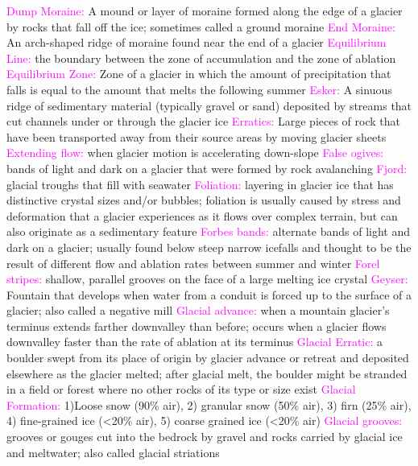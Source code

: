 \documentclass{article}
\newcommand{\pink}[1]{\textcolor{magenta}{#1}}
\newcommand{\vocab}[1]{{\pink{#1}}}
\begin{document}
\begin{multicols*}{4}
		\vocab{        Dump Moraine: } A mound or layer of moraine formed along the edge of a glacier by rocks that fall off the ice; sometimes called a ground moraine 
		\vocab{        End Moraine: } An arch-shaped ridge of moraine found near the end of a glacier 
		\vocab{Equilibrium Line: }the boundary between the zone of accumulation and the zone of ablation 
		\vocab{        Equilibrium Zone: } Zone of a glacier in which the amount of precipitation that falls is equal to the amount that melts the following summer 
		\vocab{        Esker: } A sinuous ridge of sedimentary material (typically gravel or sand) deposited by streams that cut channels under or through the glacier ice 
		\vocab{Erratics: } Large pieces of rock that have been transported away from their source areas by moving glacier sheets  
		\vocab{        Extending flow: } when glacier motion is accelerating down-slope 
		\vocab{        False ogives: } bands of light and dark on a glacier that were formed by rock avalanching 
		\vocab{        Fjord: } glacial troughs that fill with seawater 
		\vocab{        Foliation: } layering in glacier ice that has distinctive crystal sizes and/or bubbles; foliation is usually caused by stress and deformation that a glacier experiences as it flows over complex terrain, but can also originate as a sedimentary feature 
		\vocab{        Forbes bands: } alternate bands of light and dark on a glacier; usually found below steep narrow icefalls and thought to be the result of different flow and ablation rates between summer and winter 
		\vocab{        Forel stripes: } shallow, parallel grooves on the face of a large melting ice crystal  
		\vocab{        Geyser: } Fountain that develops when water from a conduit is forced up to the surface of a glacier; also called a negative mill 
		\vocab{        Glacial advance: } when a mountain glacier's terminus extends farther downvalley than before; occurs when a glacier flows downvalley faster than the rate of ablation at its terminus 
		\vocab{        Glacial Erratic: } a boulder swept from its place of origin by glacier advance or retreat and deposited elsewhere as the glacier melted; after glacial melt, the boulder might be stranded in a field or forest where no other rocks of its type or size exist 
		\vocab{Glacial Formation: } 1)Loose snow (90\% air), 2) granular snow (50\% air), 3) firn (25\% air), 4) fine-grained ice (<20\% air), 5) coarse grained ice (<20\% air)  
		\vocab{        Glacial grooves: } grooves or gouges cut into the bedrock by gravel and rocks carried by glacial ice and meltwater; also called glacial striations 

\end{multicols*}
\end{document}
